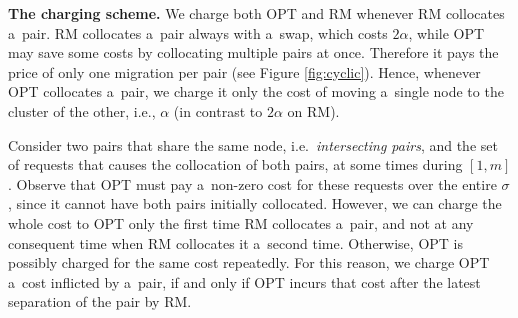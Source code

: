 \documentclass[a4paper,anonymous,USenglish]{lipics-v2019}
\newcommand{\OPT}{\textsc{OPT}\xspace}
\newcommand{\RM}{\textsc{RM}\xspace} %
\begin{document}
\noindent
\textbf{The charging scheme.}
We charge both \OPT and \RM whenever \RM collocates a~pair.%
\RM collocates a~pair always with a~swap,%
which  costs $2\alpha$,
while \OPT may save some costs by collocating multiple pairs at once.
 Therefore it pays the price of only one migration per pair  (see Figure \ref{fig:cyclic}).
Hence,
whenever \OPT collocates a~pair,
we charge it only the cost of moving a~single node to the cluster of the other,
i.e., $\alpha$ (in contrast to $2\alpha$ on \RM).

Consider two  pairs that share the same node, 
i.e.~\emph{intersecting pairs},
and the set of requests that causes the collocation of both pairs,
at some  times during  $[1,m]$.
Observe that \OPT must pay a~non-zero cost
for these requests over the entire $\sigma$,
since it cannot have both pairs initially collocated.
However,
we can charge the whole cost to \OPT only the first time \RM collocates a~pair,
and not at any consequent time when \RM collocates it a~second time.
Otherwise,
 \OPT is possibly charged for the same cost repeatedly.
For this reason,
we charge \OPT a~cost inflicted by a~pair,
if and only if  \OPT incurs that cost after the latest separation of the pair by \RM.
\end{document}
